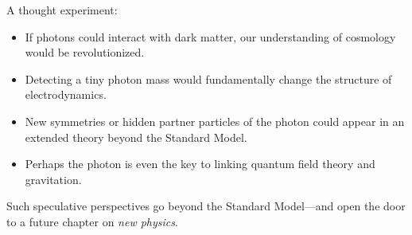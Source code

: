 \vspace{1em}
\begin{tcolorbox}[hypobox, title={What if the Standard Model were only a stepping stone?}]
	\label{Merksatz zum Photon}
	A thought experiment:
	\begin{itemize}
		\item If photons could interact with dark matter, our understanding of cosmology would be revolutionized.  
		\item Detecting a tiny photon mass would fundamentally change the structure of electrodynamics.  
		\item New symmetries or hidden partner particles of the photon could appear in an extended theory beyond the Standard Model.  
		\item Perhaps the photon is even the key to linking quantum field theory and gravitation.  
	\end{itemize}
	
	\medskip
	Such speculative perspectives go beyond the Standard Model—and open the door 
	to a future chapter on \emph{new physics}.
\end{tcolorbox}
